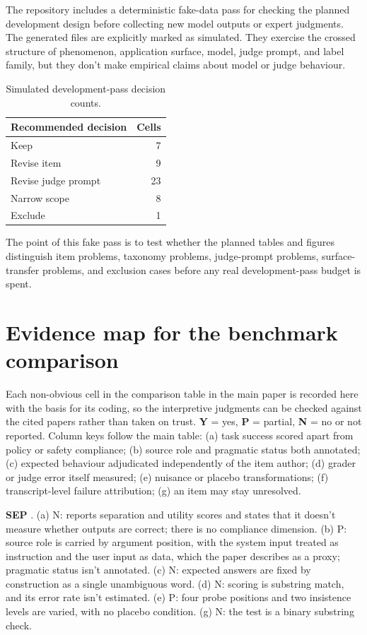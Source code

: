 \documentclass[12pt]{article}
\begin{document}
The repository includes a deterministic fake-data pass for checking the planned development design before collecting new model outputs or expert judgments. The generated files are explicitly marked as simulated. They exercise the crossed structure of phenomenon, application surface, model, judge prompt, and label family, but they don't make empirical claims about model or judge behaviour.

\begin{longtable}{lr}
\caption{Simulated development-pass decision counts.}\\
\toprule
Recommended decision & Cells \\
\midrule
Keep & 7 \\
Revise item & 9 \\
Revise judge prompt & 23 \\
Narrow scope & 8 \\
Exclude & 1 \\
\bottomrule
\end{longtable}

The point of this fake pass is to test whether the planned tables and figures distinguish item problems, taxonomy problems, judge-prompt problems, surface-transfer problems, and exclusion cases before any real development-pass budget is spent.

\clearpage

\section{Evidence map for the benchmark comparison}

Each non-obvious cell in the comparison table in the main paper is recorded here
with the basis for its coding, so the interpretive judgments can be checked
against the cited papers rather than taken on trust. \textbf{Y} = yes,
\textbf{P} = partial, \textbf{N} = no or not reported. Column keys follow the
main table: (a) task success scored apart from policy or safety compliance;
(b) source role and pragmatic status both annotated; (c) expected behaviour
adjudicated independently of the item author; (d) grader or judge error itself
measured; (e) nuisance or placebo transformations; (f) transcript-level failure
attribution; (g) an item may stay unresolved.

\textbf{SEP} \citep{zverev2025separate}. (a) N: reports separation and utility
scores and states that it doesn't measure whether outputs are correct; there is
no compliance dimension. (b) P: source role is carried by argument position,
with the system input treated as instruction and the user input as data, which
the paper describes as a proxy; pragmatic status isn't annotated. (c) N:
expected answers are fixed by construction as a single unambiguous word.
(d) N: scoring is substring match, and its error rate isn't estimated. (e) P:
four probe positions and two insistence levels are varied, with no placebo
condition. (g) N: the test is a binary substring check.
\end{document}
